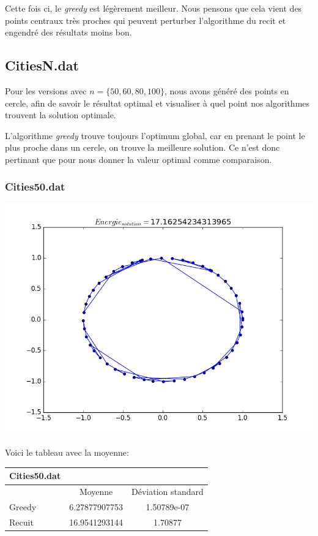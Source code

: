 \documentclass[a4paper, 11pt]{article}
\begin{document}
Cette fois ci, le \textit{greedy} est légèrement meilleur. Nous pensons que cela vient
des points centraux très proches qui peuvent perturber l'algorithme du recit  et engendré des
résultats moins bon.

\subsection{CitiesN.dat}
Pour les versions avec $n=\{50,60,80,100\}$, nous avons généré des points en cercle, afin de savoir
le résultat optimal et visualiser à quel point nos algorithmes trouvent la solution optimale.

L'algorithme \textit{greedy} trouve toujours l'optimum global, car en prenant le point le plus proche
dans un cercle, on trouve la meilleure solution. Ce n'est donc pertinant que pour nous donner la valeur optimal comme comparaison.

\subsubsection{Cities50.dat}
\includegraphics[scale=0.75]{cities50}

Voici le tableau avec la moyenne:\\
\begin{tabular}{|l | c |c |}
\hline
Cities50.dat & & \\
\hline
  & Moyenne & Déviation standard\\
  \hline
Greedy & 6.27877907753	 & 1.50789e-07 \\
\hline
Recuit & 16.9541293144	 & 1.70877\\
\hline
\end{tabular}
\end{document}
